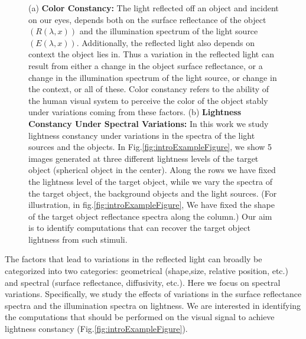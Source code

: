 \documentclass{jov}
\begin{document}
\begin{figure}[h]
    \caption{(a) {\bf Color Constancy:} The light reflected off an object and incident on our eyes, depends both on the surface reflectance of the object $\left( R(\lambda,x) \right)$ and the illumination spectrum of the light source $\left(E(\lambda,x)\right)$. Additionally, the reflected light also depends on context the object lies in. Thus a variation in the reflected light can result from either a change in the object surface reflectance, or a change in the illumination spectrum of the light source, or change in the context, or all of these. Color constancy refers to the ability of the human visual system to perceive the color of the object stably under variations coming from these factors. (b) {\bf Lightness Constancy Under Spectral Variations:} In this work we study lightness constancy under variations in the spectra of the light sources and the objects. In Fig.\ref{fig:introExampleFigure}, we show 5 images generated at three different lightness levels of the target object (spherical object in the center). Along the rows we have fixed the lightness level of the target object, while we vary the spectra of the target object, the background objects and the light sources. (For illustration, in fig.\ref{fig:introExampleFigure}, We have fixed the shape of the target object reflectance spectra along the column.) Our aim is to identify computations that can recover the target object lightness from such stimuli.} 
\end{figure}

The factors that lead to variations in the reflected light can broadly be categorized into two categories: geometrical (shape,size, relative position, etc.) and spectral (surface reflectance, diffusivity, etc.). Here we focus on spectral variations. Specifically, we study the effects of variations in the surface reflectance spectra and the illumination spectra on lightness. We are interested in identifying the computations that should be performed on the visual signal to achieve lightness constancy (Fig.\ref{fig:introExampleFigure}).
\end{document}
